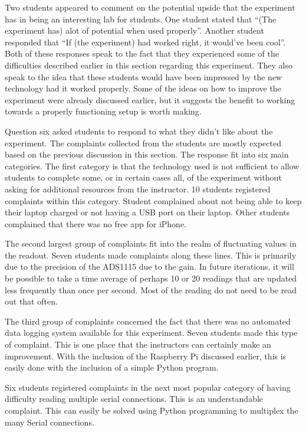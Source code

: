 Two students appeared to comment on the potential upside that the experiment has in being an interesting lab for students.
One student stated that ``(The experiment has) alot of potential when used properly''.
Another student responded that ``If (the experiment) had worked right, it would've been cool''.
Both of these responses speak to the fact that they experienced some of the difficulties described earlier in this section regarding this experiment.
They also speak to the idea that these students would have been impressed by the new technology had it worked properly.
Some of the ideas on how to improve the experiment were already discussed earlier, but it suggests the benefit to working towards a properly functioning setup is worth making.

Question six asked students to respond to what they didn't like about the experiment.
The complaints collected from the students are mostly expected based on the previous discussion in this section.
The response fit into six main categories.
The first category is that the technology used is not sufficient to allow students to complete some, or in certain cases all, of the experiment without asking for additional resources from the instructor.
10 students registered complaints within this category.
Student complained about not being able to keep their laptop charged or not having a USB port on their laptop.
Other students complained that there was no free app for iPhone.

The second largest group of complaints fit into the realm of fluctuating values in the readout.
Seven students made complaints along these lines.
This is primarily due to the precision of the ADS1115 due to the gain.
In future iterations, it will be possible to take a time average of perhaps 10 or 20 readings that are updated less frequently than once per second.
Most of the reading do not need to be read out that often.

The third group of complaints concerned the fact that there was no automated data logging system available for this experiment.
Seven students made this type of complaint.
This is one place that the instructors can certainly make an improvement.
With the inclusion of the Raspberry Pi discussed earlier, this is easily done with the inclusion of a simple Python program.

Six students registered complaints in the next most popular category of having difficulty reading multiple serial connections.
This is an understandable complaint.
This can easily be solved using Python programming to multiplex the many Serial connections.

